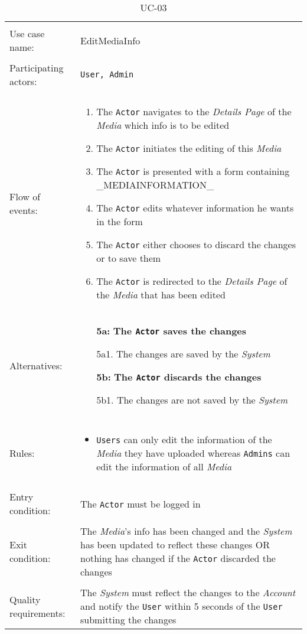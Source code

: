 \documentclass[../report.tex]{subfiles}
\begin{document}
\noindent
\begin{table}
\caption{UC-03}
\label{UC-03}
\begin{tabular}{ l  p{8cm} }  
\hline
\\
Use case name:  & EditMediaInfo   \\   \hline    
\\            
Participating actors:  & \texttt{\texttt{User}, \texttt{Admin}} \\   \hline   
\\             
Flow of events: & \begin{enumerate}
\item{The \texttt{Actor} navigates to the \textit{Details Page} of the \textit{Media} which info is to be edited}
\item{The \texttt{Actor} initiates the editing of this \textit{Media}}
\item{The \texttt{Actor} is presented with a form containing \_MEDIAINFORMATION\_}
\item{The \texttt{Actor} edits whatever information he wants in the form}
\item{The \texttt{Actor} either chooses to discard the changes or to save them}
\item{The \texttt{Actor} is redirected to the \textit{Details Page} of the \textit{Media} that has been edited}
\end{enumerate}
\\
Alternatives: & \begin{itemize}
\item[\textbf{5a:}]{\textbf{The \texttt{Actor} saves the changes}}
\item[]  5a1. The changes are saved by the \textit{System}
\item[\textbf{5b:}]{\textbf{The \texttt{Actor} discards the changes}}
\item[]  5b1. The changes are not saved by the \textit{System}
\end{itemize}
\\ \hline
\\
Rules: & \begin{itemize}
\item{\texttt{Users} can only edit the information of the \textit{Media} they have uploaded whereas \texttt{Admins} can edit the information of all \textit{Media}}
\end{itemize}
\\   \hline 
\\
Entry condition: & The \texttt{Actor} must be logged in \\ \hline
\\
Exit condition: & The \textit{Media}'s info has been changed and the \textit{System} has been updated to reflect these changes OR
nothing has changed if the \texttt{Actor} discarded the changes \\ \hline
\\
Quality requirements: & The \textit{System} must reflect the changes to the \textit{Account} and notify the \texttt{User} within 5 seconds of the \texttt{User} submitting the changes \\ \hline  
\end{tabular}
\end{table}
\end{document}
